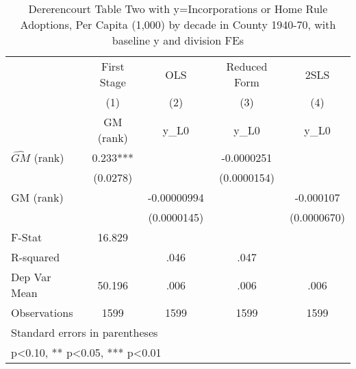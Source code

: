 \begin{table}[htbp]\centering
\def\sym#1{\ifmmode^{#1}\else\(^{#1}\)\fi}
\caption{Dererencourt Table Two with y=Incorporations or Home Rule Adoptions, Per Capita (1,000) by decade in County 1940-70, with baseline y and division FEs}
\begin{tabular}{l*{4}{c}}
\toprule
                    & First Stage   &         OLS   &Reduced Form   &        2SLS   \\
                    &\multicolumn{1}{c}{(1)}&\multicolumn{1}{c}{(2)}&\multicolumn{1}{c}{(3)}&\multicolumn{1}{c}{(4)}\\
                    &\multicolumn{1}{c}{GM  (rank)}&\multicolumn{1}{c}{y\_L0}&\multicolumn{1}{c}{y\_L0}&\multicolumn{1}{c}{y\_L0}\\
\midrule
$\hat{GM}$ (rank)   &       0.233***&               &  -0.0000251   &               \\
                    &    (0.0278)   &               & (0.0000154)   &               \\
\addlinespace
GM  (rank)          &               & -0.00000994   &               &   -0.000107   \\
                    &               & (0.0000145)   &               & (0.0000670)   \\
\midrule
F-Stat              &      16.829   &               &               &               \\
R-squared           &               &        .046   &        .047   &               \\
Dep Var Mean        &      50.196   &        .006   &        .006   &        .006   \\
Observations        &        1599   &        1599   &        1599   &        1599   \\
\bottomrule
\multicolumn{5}{l}{\footnotesize Standard errors in parentheses}\\
\multicolumn{5}{l}{\footnotesize * p<0.10, ** p<0.05, *** p<0.01}\\
\end{tabular}
\end{table}
